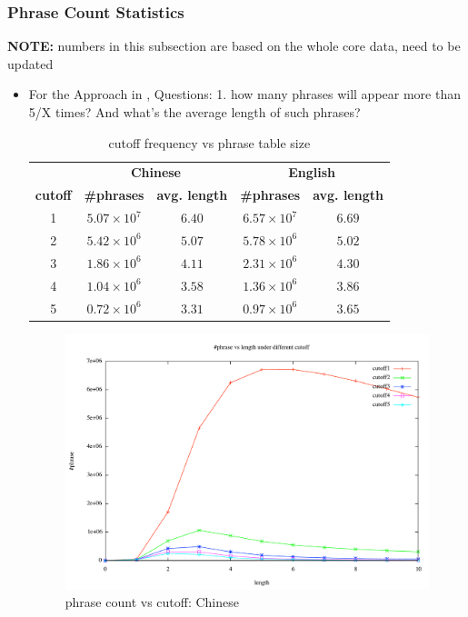 \documentclass[11pt, letterpaper]{article}   	%
\begin{document}
\subsubsection{Phrase Count Statistics}
\textbf{NOTE:} numbers in this subsection are based on the whole core data, need to be updated
\begin{itemize}
\item For the Approach in \cite{marcu-wong-02},
Questions: 1. how many phrases will appear more than 5/X times? And what's the average length of such phrases? 

\begin{table}[H]
\centering
\begin{tabular}{ c | c | c | c | c }
 & \multicolumn{2}{c}{\bf{Chinese}} & \multicolumn{2}{|c}{\bf{English}}  \\
  \cline{2-5} 
  \bf{cutoff} & \bf{\#phrases} & \bf{avg. length} & \bf{\#phrases} & \bf{avg. length} \\
  \hline
  1 & $5.07 \times 10^7$  & $6.40$ & $6.57\times 10^7$ & $6.69$  \\
  \hline
  2 & $5.42\times 10^6$ & $5.07$ &$5.78\times 10^6$ & $5.02$\\
  \hline
  3 & $1.86\times 10^6$  & $4.11$ & $2.31\times 10^6$& $4.30$\\
  \hline
  4 & $1.04\times 10^6$ & $3.58$ &$1.36\times 10^6$ &$3.86$\\
 \hline
  5 & $0.72\times 10^6$ & $3.31$ & $0.97\times 10^6$&$3.65$\\
  \hline
 \end{tabular}
 \caption{cutoff frequency vs phrase table size}
  \label{tab:phrase-cutoff}
\end{table}

\begin{figure}[p]
\centering
\includegraphics[width=1.0\textwidth]{phrase-count-chinese.pdf}
\caption{phrase count vs cutoff: Chinese}
\label{fig:phrase-count-chinese}
\end{figure}


\end{itemize}
\end{document}
